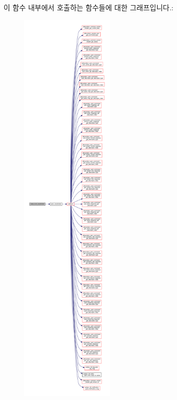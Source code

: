 이 함수 내부에서 호출하는 함수들에 대한 그래프입니다.\+:
\nopagebreak
\begin{figure}[H]
\begin{center}
\leavevmode
\includegraphics[height=550pt]{classavdecc__lib_1_1aecp__controller__state__machine_a02520027d366c215f1e813aece78451e_cgraph}
\end{center}
\end{figure}





